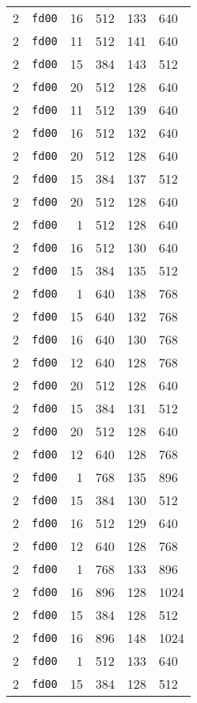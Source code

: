 \documentclass{article}
\begin{document}
\begin{table}[h!]
\begin{tabular}{llrrrl}
    2 & \texttt{fd00} & 16 & 512 & 133 & 640 \\
    2 & \texttt{fd00} & 11 & 512 & 141 & 640 \\
    2 & \texttt{fd00} & 15 & 384 & 143 & 512 \\
    2 & \texttt{fd00} & 20 & 512 & 128 & 640 \\
    2 & \texttt{fd00} & 11 & 512 & 139 & 640 \\
    2 & \texttt{fd00} & 16 & 512 & 132 & 640 \\
    2 & \texttt{fd00} & 20 & 512 & 128 & 640 \\
    2 & \texttt{fd00} & 15 & 384 & 137 & 512 \\
    2 & \texttt{fd00} & 20 & 512 & 128 & 640 \\
    2 & \texttt{fd00} & 1 & 512 & 128 & 640 \\
    2 & \texttt{fd00} & 16 & 512 & 130 & 640 \\
    2 & \texttt{fd00} & 15 & 384 & 135 & 512 \\
    2 & \texttt{fd00} & 1 & 640 & 138 & 768 \\
    2 & \texttt{fd00} & 15 & 640 & 132 & 768 \\
    2 & \texttt{fd00} & 16 & 640 & 130 & 768 \\
    2 & \texttt{fd00} & 12 & 640 & 128 & 768 \\
    2 & \texttt{fd00} & 20 & 512 & 128 & 640 \\
    2 & \texttt{fd00} & 15 & 384 & 131 & 512 \\
    2 & \texttt{fd00} & 20 & 512 & 128 & 640 \\
    2 & \texttt{fd00} & 12 & 640 & 128 & 768 \\
    2 & \texttt{fd00} & 1 & 768 & 135 & 896 \\
    2 & \texttt{fd00} & 15 & 384 & 130 & 512 \\
    2 & \texttt{fd00} & 16 & 512 & 129 & 640 \\
    2 & \texttt{fd00} & 12 & 640 & 128 & 768 \\
    2 & \texttt{fd00} & 1 & 768 & 133 & 896 \\
    2 & \texttt{fd00} & 16 & 896 & 128 & 1024 \\
    2 & \texttt{fd00} & 15 & 384 & 128 & 512 \\
    2 & \texttt{fd00} & 16 & 896 & 148 & 1024 \\
    2 & \texttt{fd00} & 1 & 512 & 133 & 640 \\
    2 & \texttt{fd00} & 15 & 384 & 128 & 512 \\

\end{tabular}
\end{table}
\end{document}
